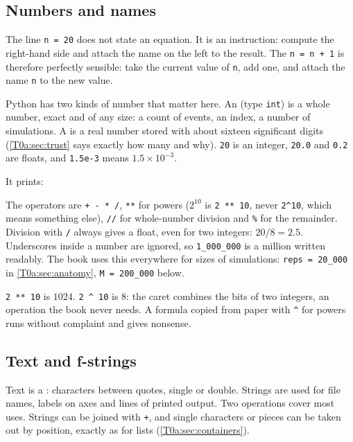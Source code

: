 \subsection{Numbers and names}
\label{T0a:sec:numbers}

The line \texttt{n = 20} does not state an equation. It is an instruction: compute the right-hand side and attach the name on the left to the result. The  \texttt{n = n + 1} is therefore perfectly sensible: take the current value of \texttt{n}, add one, and attach the name \texttt{n} to the new value.

Python has two kinds of number that matter here. An  (type \texttt{int}) is a whole number, exact and of any size: a count of events, an index, a number of simulations. A  is a real number stored with about sixteen significant digits (\cref{T0a:sec:trust} says exactly how many and why). \texttt{20} is an integer, \texttt{20.0} and \texttt{0.2} are floats, and \texttt{1.5e-3} means $1.5\times10^{-3}$.

\noindent It prints:

The operators are \texttt{+ - * /}, \texttt{**} for powers ($2^{10}$ is \texttt{2 ** 10}, never \verb|2^10|, which means something else), \texttt{//} for whole-number division and \texttt{\%} for the remainder. Division with \texttt{/} always gives a float, even for two integers: $20/8=2.5$. Underscores inside a number are ignored, so \texttt{1\_000\_000} is a million written readably. The book uses this everywhere for sizes of simulations: \texttt{reps = 20\_000} in \cref{T0a:sec:anatomy}, \texttt{M = 200\_000} below.

\begin{pitfall}
\texttt{2 ** 10} is $1024$. \verb|2 ^ 10| is $8$: the caret combines the bits of two integers, an operation the book never needs. A formula copied from paper with \verb|^| for powers runs without complaint and gives nonsense.
\end{pitfall}

\subsection{Text and f-strings}
\label{T0a:sec:strings}

Text is a : characters between quotes, single or double. Strings are used for file names, labels on axes and lines of printed output. Two operations cover most uses. Strings can be joined with \texttt{+}, and single characters or pieces can be taken out by position, exactly as for lists (\cref{T0a:sec:containers}).

